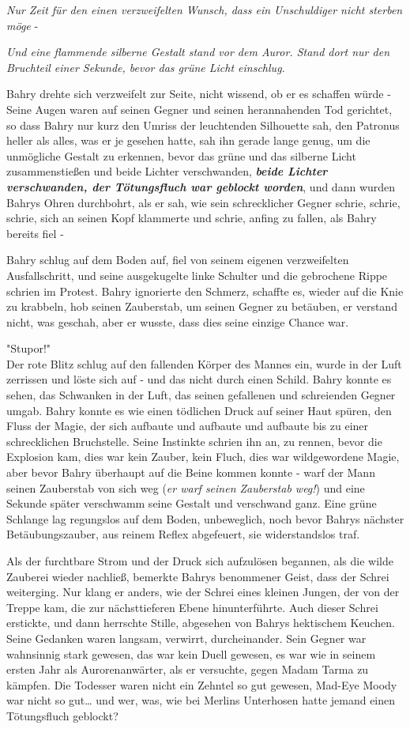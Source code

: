 {\emph{Nur Zeit für den einen verzweifelten Wunsch, dass ein Unschuldiger nicht sterben möge} -

\emph{Und eine flammende silberne Gestalt stand vor dem Auror. Stand dort nur den Bruchteil einer Sekunde, bevor das grüne Licht einschlug.}

Bahry drehte sich verzweifelt zur Seite, nicht wissend, ob er es schaffen würde - Seine Augen waren auf seinen Gegner und seinen herannahenden Tod gerichtet, so dass Bahry nur kurz den Umriss der leuchtenden Silhouette sah, den Patronus heller als alles, was er je gesehen hatte, sah ihn gerade lange genug, um die unmögliche Gestalt zu erkennen, bevor das grüne und das silberne Licht zusammenstießen und beide Lichter verschwanden, \textbf{\emph{beide Lichter verschwanden, der Tötungsfluch war geblockt worden}}, und dann wurden Bahrys Ohren durchbohrt, als er sah, wie sein schrecklicher Gegner schrie, schrie, schrie, sich an seinen Kopf klammerte und schrie, anfing zu fallen, als Bahry bereits fiel -

Bahry schlug auf dem Boden auf, fiel von seinem eigenen verzweifelten Ausfallschritt, und seine ausgekugelte linke Schulter und die gebrochene Rippe schrien im Protest. Bahry ignorierte den Schmerz, schaffte es, wieder auf die Knie zu krabbeln, hob seinen Zauberstab, um seinen Gegner zu betäuben, er verstand nicht, was geschah, aber er wusste, dass dies seine einzige Chance war.

"Stupor!"\\ Der rote Blitz schlug auf den fallenden Körper des Mannes ein, wurde in der Luft zerrissen und löste sich auf - und das nicht durch einen Schild. Bahry konnte es sehen, das Schwanken in der Luft, das seinen gefallenen und schreienden Gegner umgab. Bahry konnte es wie einen tödlichen Druck auf seiner Haut spüren, den Fluss der Magie, der sich aufbaute und aufbaute und aufbaute bis zu einer schrecklichen Bruchstelle. Seine Instinkte schrien ihn an, zu rennen, bevor die Explosion kam, dies war kein Zauber, kein Fluch, dies war wildgewordene Magie, aber bevor Bahry überhaupt auf die Beine kommen konnte - warf der Mann seinen Zauberstab von sich weg (\emph{er warf seinen Zauberstab weg!}) und eine Sekunde später verschwamm seine Gestalt und verschwand ganz. Eine grüne Schlange lag regungslos auf dem Boden, unbeweglich, noch bevor Bahrys nächster Betäubungszauber, aus reinem Reflex abgefeuert, sie widerstandslos traf.

Als der furchtbare Strom und der Druck sich aufzulösen begannen, als die wilde Zauberei wieder nachließ, bemerkte Bahrys benommener Geist, dass der Schrei weiterging. Nur klang er anders, wie der Schrei eines kleinen Jungen, der von der Treppe kam, die zur nächsttieferen Ebene hinunterführte. Auch dieser Schrei erstickte, und dann herrschte Stille, abgesehen von Bahrys hektischem Keuchen. Seine Gedanken waren langsam, verwirrt, durcheinander. Sein Gegner war wahnsinnig stark gewesen, das war kein Duell gewesen, es war wie in seinem ersten Jahr als Aurorenanwärter, als er versuchte, gegen Madam Tarma zu kämpfen. Die Todesser waren nicht ein Zehntel so gut gewesen, Mad-Eye Moody war nicht so gut… und wer, was, wie bei Merlins Unterhosen hatte jemand einen Tötungsfluch geblockt?

}
